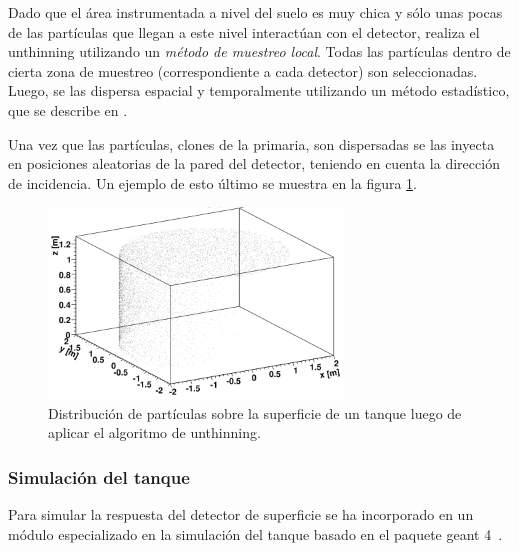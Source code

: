 		Dado que el \'area instrumentada a nivel del suelo es muy chica y s\'olo unas pocas de las part\'iculas que llegan a este nivel interactúan con el detector,
		\Offline{} realiza el unthinning utilizando un \textit{m\'etodo de muestreo local}.
		Todas las part\'iculas dentro de cierta zona de muestreo (correspondiente a cada detector) son seleccionadas.
		Luego, se las dispersa espacial y temporalmente utilizando un m\'etodo estad\'istico, que se describe en \cite{unthinning1}.
		
		Una vez que las part\'iculas, clones de la primaria, son dispersadas se las inyecta en posiciones aleatorias de la pared del detector, teniendo en cuenta la direcci\'on de incidencia. 
		Un ejemplo de esto \'ultimo se muestra en la figura \ref{fig:unthinning_tank}.
		\begin{figure}[h!]
			\begin{center}
			\includegraphics[width=0.7\textwidth]{fig/simulacionAuger/unthinning_tank}
			\caption{Distribuci\'on de part\'iculas sobre la superficie de un tanque luego de aplicar el algoritmo de unthinning.}
			\label{fig:unthinning_tank}
			\end{center}
		\end{figure}
		
		
		
		\subsubsection{Simulaci\'on del tanque}
		
		Para simular la respuesta del detector de superficie se ha incorporado en \Offline{} un m\'odulo especializado en la simulaci\'on del tanque basado en el paquete {\sc geant 4}~\cite{geant4}.
		
